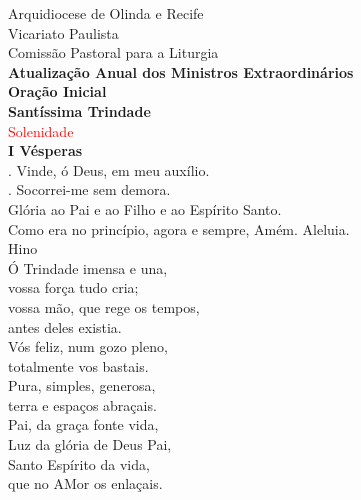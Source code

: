 \documentclass{book}
\begin{document}
\pagestyle{empty}
\begin{center}
    Arquidiocese de Olinda e Recife \\
    Vicariato Paulista \\
    Comissão Pastoral para a Liturgia
    \vspace{.2cm} \\
    \textbf{Atualização Anual dos Ministros Extraordinários}
    \vspace{.2cm} \\
    \textbf{Oração Inicial}
    \vspace{.2cm} \\
    \textbf{Santíssima Trindade} \\
    \textcolor{red}{Solenidade}
    \vspace{.2cm} \\
    \textbf{I Vésperas}
    \vspace{.2cm} \\
    {\color{VioletRed2} \Vbar.} Vinde, ó Deus, em meu auxílio. \\
    {\color{VioletRed2} \Rbar.} Socorrei-me sem demora. \\
    Glória ao Pai e ao Filho e ao Espírito Santo. \\
    Como era no princípio, agora e sempre, Amém. Aleluia.
    \vspace{.2cm} \\
    \textcolor{VioletRed2}{Hino}
    \vspace{.2cm} \\
    Ó Trindade imensa e una, \\
    vossa força tudo cria; \\
    vossa mão, que rege os tempos, \\
    antes deles existia.
    \vspace{.2cm} \\
    Vós feliz, num gozo pleno, \\
    totalmente vos bastais. \\
    Pura, simples, generosa, \\
    terra e espaços abraçais.
    \vspace{.2cm} \\
    Pai, da graça fonte vida, \\
    Luz da glória de Deus Pai, \\
    Santo Espírito da vida, \\
    que no AMor os enlaçais.
    \vspace{.2cm} \\

\end{center}
\end{document}
